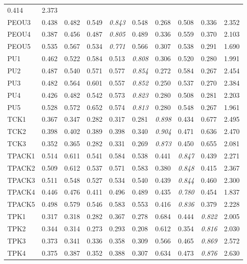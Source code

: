 \documentclass[english]{textolivre}
\begin{document}
\begin{table}[h!]
\begin{threeparttable}
\begin{tabular}{llllllllll}
0.414 & 2.373  \\
PEOU3 & 0.438 & 0.482 & 0.549 & \emph{0.843 } & 0.548 & 0.268 & 0.508 &
0.336 & 2.352  \\
PEOU4 & 0.387 & 0.456 & 0.487 & \emph{0.805 } & 0.489 & 0.336 & 0.559 &
0.370 & 2.103  \\
PEOU5 & 0.535 & 0.567 & 0.534 & \emph{0.771 } & 0.566 & 0.307 & 0.538 &
0.291 & 1.690  \\
PU1 & 0.462 & 0.522 & 0.584 & 0.513 & \emph{0.808 } & 0.306 & 0.520 &
0.280 & 1.991  \\
PU2 & 0.487 & 0.540 & 0.571 & 0.577 & \emph{0.854 } & 0.272 & 0.584 &
0.267 & 2.454  \\
PU3 & 0.482 & 0.564 & 0.601 & 0.557 & \emph{0.852 } & 0.250 & 0.537 &
0.270 & 2.384  \\
PU4 & 0.426 & 0.482 & 0.542 & 0.573 & \emph{0.823 } & 0.280 & 0.508 &
0.281 & 2.203  \\
PU5 & 0.528 & 0.572 & 0.652 & 0.574 & \emph{0.813 } & 0.280 & 0.548 &
0.267 & 1.961  \\
TCK1 & 0.367 & 0.347 & 0.282 & 0.317 & 0.281 & \emph{0.898 } & 0.434 &
0.677 & 2.495  \\
TCK2 & 0.398 & 0.402 & 0.389 & 0.398 & 0.340 & \emph{0.904 } & 0.471 &
0.636 & 2.470  \\
TCK3 & 0.352 & 0.365 & 0.282 & 0.331 & 0.269 & \emph{0.873 } & 0.450 &
0.655 & 2.081  \\
TPACK1 & 0.514 & 0.611 & 0.541 & 0.584 & 0.538 & 0.441 & \emph{0.847 } &
0.439 & 2.271  \\
TPACK2 & 0.509 & 0.612 & 0.537 & 0.571 & 0.583 & 0.380 & \emph{0.848 } &
0.415 & 2.367  \\
TPACK3 & 0.511 & 0.548 & 0.527 & 0.534 & 0.540 & 0.439 & \emph{0.844 } &
0.460 & 2.300  \\
TPACK4 & 0.446 & 0.476 & 0.411 & 0.496 & 0.489 & 0.435 & \emph{0.780 } &
0.454 & 1.837  \\
TPACK5 & 0.498 & 0.579 & 0.546 & 0.583 & 0.553 & 0.416 & \emph{0.836 } &
0.379 & 2.228  \\
TPK1 & 0.317 & 0.318 & 0.282 & 0.367 & 0.278 & 0.684 & 0.444 &
\emph{0.822 } & 2.005  \\
TPK2 & 0.344 & 0.314 & 0.273 & 0.293 & 0.208 & 0.612 & 0.354 &
\emph{0.816 } & 2.030  \\
TPK3 & 0.373 & 0.341 & 0.336 & 0.358 & 0.309 & 0.566 & 0.465 &
\emph{0.869 } & 2.572  \\
TPK4 & 0.375 & 0.387 & 0.352 & 0.388 & 0.307 & 0.634 & 0.473 &
\emph{0.876 } & 2.630  \\
\bottomrule
\end{tabular}
\end{threeparttable}
\end{table}
\end{document}
